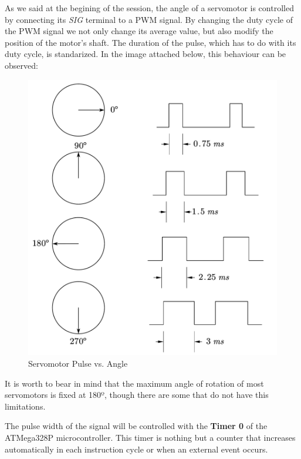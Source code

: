 As we said at the begining of the session, the angle of a servomotor is controlled by connecting its \textit{SIG} terminal to a PWM signal. By changing the duty cycle of the PWM signal we not only change its average value, but also modify the position of the motor's shaft. The duration of the pulse, which has to do with its duty cycle, is standarized. In the image attached below, this behaviour can be observed:

\begin{figure}[H]
    \centering
    \includegraphics[scale = 0.3]{Graphics/MICROS/Practice 4/SERVO_POSITION.pdf}
    \caption{Servomotor Pulse vs. Angle}
    \label{fig:SERVO_ROTATION}
\end{figure}

It is worth to bear in mind that the maximum angle of rotation of most servomotors is fixed at 180º, though there are some that do not have this limitations.\medskip

The pulse width of the signal will be controlled with the \textbf{Timer 0} of the ATMega328P microcontroller. This timer is nothing but a counter that increases automatically in each instruction cycle or when an external event occurs. \medskip

